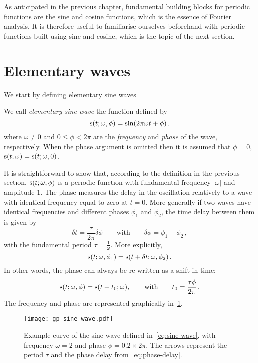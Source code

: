 As anticipated in the previous chapter, fundamental building blocks for periodic functions
are the sine and cosine functions, which is the essence of Fourier analysis. It is
therefore useful to familiarise ourselves beforehand with periodic functions built using
sine and cosine, which is the topic of the next section.
\section{Elementary waves}
We start by defining elementary sine waves
\begin{definition}
  \label{def:sine-wave}
  We call \emph{elementary sine wave} the function defined by
  \begin{equation}
    \operatorname{s}(t;\omega,\phi)=\sin(2\pi\omega t + \phi)\,.\label{eq:sine-wave}
  \end{equation}
  where $\omega\neq 0$ and $0\leq\phi<2\pi$ are the \emph{frequency} and \emph{phase} of
  the wave, respectively. When the phase argument is omitted then it is assumed that
  $\phi=0$, \ie $\operatorname{s}(t;\omega)=\operatorname{s}(t;\omega,0)$.
\end{definition}
\noindent It is straightforward to show that, according to the definition in the previous
section, $\operatorname{s}(t;\omega,\phi)$ is a periodic function with fundamental frequency $|\omega|$
and amplitude $1$. The phase measures the delay in the oscillation relatively to a wave
with identical frequency equal to zero at $t=0$. More generally if two waves have
identical frequencies and different phases $\phi_1$ and $\phi_2$, the time delay between
them is given by
\begin{equation}
  \delta t =\frac{\tau}{2\pi}\delta\phi\qquad\text{with}\qquad\delta\phi=\phi_1-\phi_2\,,
\end{equation}
with the fundamental period $\tau=\frac{1}{\omega}$. More explicitly,
\begin{equation}
  \operatorname{s}(t;\omega,\phi_1)=\operatorname{s}(t+\delta t;\omega,\phi_2)\,.
\end{equation}
In other words, the phase can always be re-written as a shift in time:
\begin{equation}
  \operatorname{s}(t;\omega,\phi)=\operatorname{s}(t+t_0;\omega),
  \qquad\text{with}\qquad
  t_0 = \frac{\tau\phi}{2\pi}\,.\label{eq:phase-delay}
\end{equation}
The frequency and phase are represented graphically in~\cref{fig:sine-wave}.
\begin{figure}[t]
  \centering
  \texttt{[image: gp\_sine-wave.pdf]}
  \caption{Example curve of the sine wave defined in~\cref{eq:sine-wave}, with frequency
    $\omega=2$ and phase $\phi=0.2\times 2\pi$. The arrows represent the period $\tau$ and
  the phase delay from~\cref{eq:phase-delay}.}
  \label{fig:sine-wave}
\end{figure}
